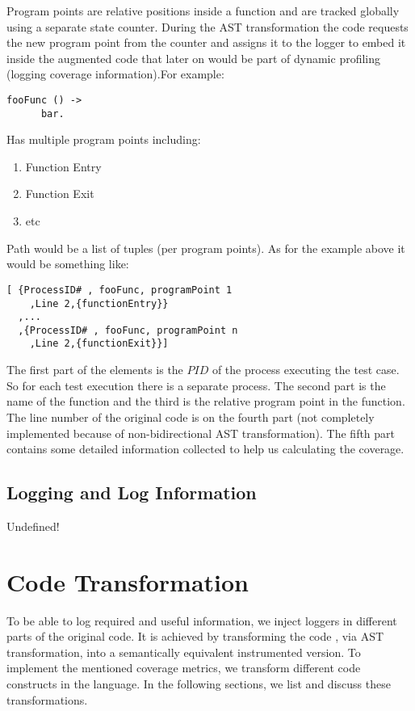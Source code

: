 \documentclass[12pt,a4paper]{report}
\begin{document}
Program points are relative positions inside a function and are tracked globally using a separate state counter. During the AST transformation the code requests the new
 program point from the counter and assigns it to the logger to embed it inside the augmented code that later on would be part of dynamic profiling (logging coverage
 information).For example:

\begin{lstlisting}
fooFunc () -> 
      bar.  
\end{lstlisting}

Has multiple program points including:

\begin{enumerate}
 \item Function Entry
 \item Function Exit
 \item etc
\end{enumerate}
 
Path would be a list of tuples (per program points). As for the example above it would be something like:

\begin{lstlisting}
[ {ProcessID# , fooFunc, programPoint 1
    ,Line 2,{functionEntry}}
  ,...
  ,{ProcessID# , fooFunc, programPoint n
    ,Line 2,{functionExit}}]
\end{lstlisting}

The first part of the elements is the $PID$ of the process executing the test case. So for each test execution there is a separate process. The second part is the name of the
 function and the third is the relative program point in the function. The line number of the original code is on the fourth part (not completely implemented because of
 non-bidirectional AST transformation). The fifth part contains some detailed information collected to help us calculating the coverage.   

\subsection{Logging and Log Information}
Undefined!

\section{Code Transformation}
To be able to log required and useful information, we inject loggers in different parts of the original code. It is achieved by transforming the code , via AST transformation, into a semantically equivalent instrumented version. To implement the mentioned coverage metrics, we transform different code constructs in the language. In the following sections, we list and discuss these transformations.
\end{document}
